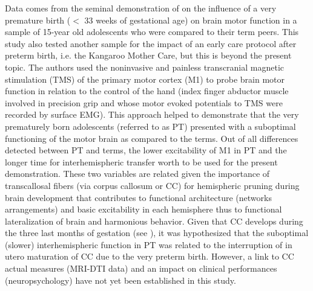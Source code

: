 \documentclass[twocolumn]{svjour3}
\begin{document}
Data comes from the seminal demonstration of \cite{schneider_cerebral_2012} on the influence of a very premature birth ($<$ 33 weeks of gestational age) on brain motor function in a sample of 15-year old adolescents who were compared to their term peers. This study also tested another sample for the impact of an early care protocol after preterm birth, i.e. the Kangaroo Mother Care, but this is beyond the present topic. The authors used the noninvasive and painless transcranial magnetic stimulation (TMS) of the primary motor cortex (M1) to probe brain motor function in relation to the control of the hand (index finger abductor muscle involved in precision grip and whose motor evoked potentials to TMS were recorded by surface EMG). This approach helped to demonstrate that the very prematurely born adolescents (referred to as PT) presented with a suboptimal functioning of the motor brain as compared to the terms. Out of all differences detected between PT and terms, the lower excitability of M1 in PT and the longer time for interhemispheric transfer worth to be used for the present demonstration. These two variables are related given the importance of transcallosal fibers (via corpus callosum or CC) for hemispheric pruning during brain development that contributes to functional architecture (networks arrangements) and basic excitability in each hemisphere thus to functional lateralization of brain and harmonious behavior. Given that CC develops during the three last months of gestation (see \cite{schneider_cerebral_2012}), it was hypothesized that the suboptimal (slower) interhemispheric function in PT was related to the interruption of in utero maturation of CC due to the very preterm birth. However, a link to CC actual measures (MRI-DTI data) and an impact on clinical performances (neuropsychology) have not yet been established in this study.
\end{document}
